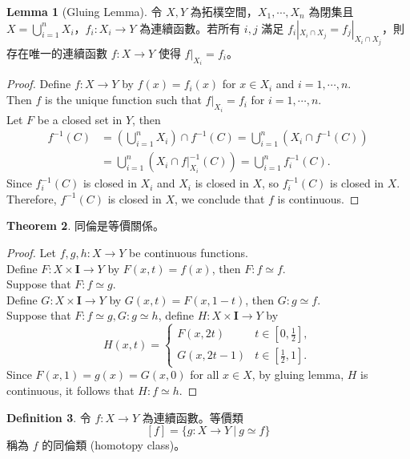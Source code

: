 \documentclass[12pt]{article}
\theoremstyle{definition}
\newtheorem{definition}{Definition}[section]
\newtheorem{theorem}[definition]{Theorem}
\newtheorem{lemma}[definition]{Lemma}
\newcommand\<{\langle}
\renewcommand\>{\rangle}
\begin{document}
\begin{CJK}{UTF8}{bsmi}
\begin{lemma}[Gluing Lemma]
    令 $X, Y$ 為拓樸空間，$X_1, \cdots, X_n$ 為閉集且 $X=\bigcup_{i=1}^n X_i$，$f_i:X_i\to Y$ 為連續函數。若所有 $i, j$ 滿足 $f_i|_{X_i\cap X_j}=f_j|_{X_i\cap X_j}$，則存在唯一的連續函數 $f:X\to Y$ 使得 $f|_{X_i}=f_i$。
\end{lemma}
\begin{proof}
    Define $f:X\to Y$ by $f(x)=f_i(x)$ for $x\in X_i$ and $i=1, \cdots, n$. \\
    Then $f$ is the unique function such that $f|_{X_i}=f_i$ for $i=1, \cdots, n$. \\
    Let $F$ be a closed set in $Y$, then
    \begin{align*}
        f^{-1}(C) 
        & = \left(\bigcup_{i=1}^n X_i\right)\cap f^{-1}(C)
          = \bigcup_{i=1}^n \left(X_i\cap f^{-1}(C)\right) \\
        & = \bigcup_{i=1}^n \left(X_i\cap f|_{X_i}^{-1}(C)\right)
          = \bigcup_{i=1}^n f_i^{-1}(C).
    \end{align*}
    Since $f_i^{-1}(C)$ is closed in $X_i$ and $X_i$ is closed in $X$, so $f_i^{-1}(C)$ is closed in $X$. \\
    Therefore, $f^{-1}(C)$ is closed in $X$, we conclude that $f$ is continuous.
\end{proof}

\begin{theorem}
    同倫是等價關係。
\end{theorem}
\begin{proof}
    Let $f, g, h:X\to Y$ be continuous functions. \\
    Define $F:X\times\textbf{I}\to Y$ by $F(x, t)=f(x)$, then $F:f\simeq f$. \\
    Suppose that $F:f\simeq g$. \\
    Define $G:X\times\textbf{I}\to Y$ by $G(x, t)=F(x, 1-t)$, then $G:g\simeq f$. \\
    Suppose that $F:f\simeq g, G:g\simeq h$, define $H:X\times\textbf{I}\to Y$ by 
    \[
        H(x, t) = \begin{cases}
            F(x, 2t) & t\in[0, \frac{1}{2}], \\
            G(x, 2t-1) & t\in[\frac{1}{2}, 1].
        \end{cases}
    \]
    Since $F(x, 1)=g(x)=G(x, 0)$ for all $x\in X$, by gluing lemma, $H$ is continuous, it follows that $H:f\simeq h$.
\end{proof}

\begin{definition}
    令 $f:X\to Y$ 為連續函數。等價類
    \[
        [f] = \{g:X\to Y\ |\ g\simeq f\}
    \]
    稱為 $f$ 的同倫類 (homotopy class)。
\end{definition}


\end{CJK}
\end{document}
